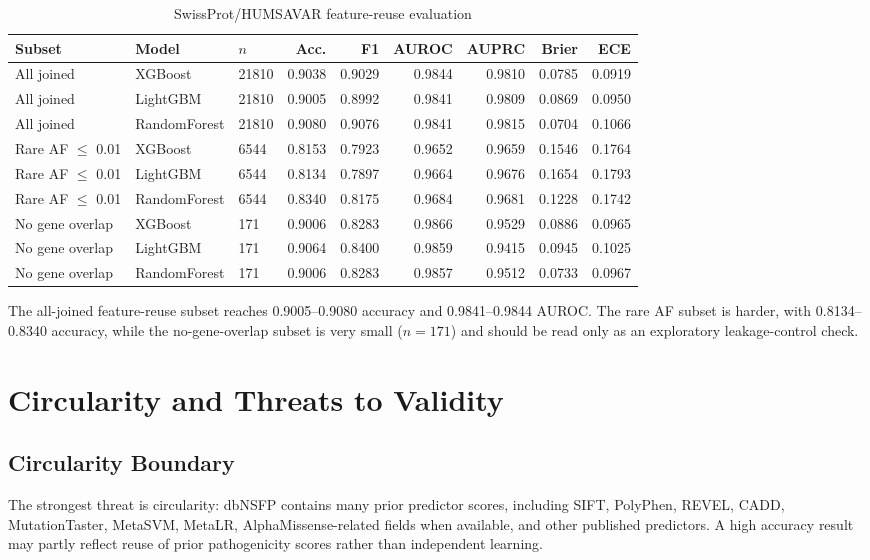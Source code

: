 \documentclass[conference]{IEEEtran}
\begin{document}
\begin{table}[t]
\centering
\scriptsize
\caption{SwissProt/HUMSAVAR feature-reuse evaluation}
\label{tab:swissprot-eval}
\begin{tabular}{lllrrrrrr}
\toprule
Subset & Model & $n$ & Acc. & F1 & AUROC & AUPRC & Brier & ECE \\
\midrule
All joined & XGBoost & 21810 & 0.9038 & 0.9029 & 0.9844 & 0.9810 & 0.0785 & 0.0919 \\
All joined & LightGBM & 21810 & 0.9005 & 0.8992 & 0.9841 & 0.9809 & 0.0869 & 0.0950 \\
All joined & RandomForest & 21810 & 0.9080 & 0.9076 & 0.9841 & 0.9815 & 0.0704 & 0.1066 \\
Rare AF $\leq$ 0.01 & XGBoost & 6544 & 0.8153 & 0.7923 & 0.9652 & 0.9659 & 0.1546 & 0.1764 \\
Rare AF $\leq$ 0.01 & LightGBM & 6544 & 0.8134 & 0.7897 & 0.9664 & 0.9676 & 0.1654 & 0.1793 \\
Rare AF $\leq$ 0.01 & RandomForest & 6544 & 0.8340 & 0.8175 & 0.9684 & 0.9681 & 0.1228 & 0.1742 \\
No gene overlap & XGBoost & 171 & 0.9006 & 0.8283 & 0.9866 & 0.9529 & 0.0886 & 0.0965 \\
No gene overlap & LightGBM & 171 & 0.9064 & 0.8400 & 0.9859 & 0.9415 & 0.0945 & 0.1025 \\
No gene overlap & RandomForest & 171 & 0.9006 & 0.8283 & 0.9857 & 0.9512 & 0.0733 & 0.0967 \\
\bottomrule
\end{tabular}
\end{table}

The all-joined feature-reuse subset reaches 0.9005--0.9080 accuracy and 0.9841--0.9844 AUROC. The rare AF subset is harder, with 0.8134--0.8340 accuracy, while the no-gene-overlap subset is very small ($n=171$) and should be read only as an exploratory leakage-control check.

\section{Circularity and Threats to Validity}
\subsection{Circularity Boundary}
The strongest threat is circularity: dbNSFP contains many prior predictor scores, including SIFT, PolyPhen, REVEL, CADD, MutationTaster, MetaSVM, MetaLR, AlphaMissense-related fields when available, and other published predictors. A high accuracy result may partly reflect reuse of prior pathogenicity scores rather than independent learning.
\end{document}
